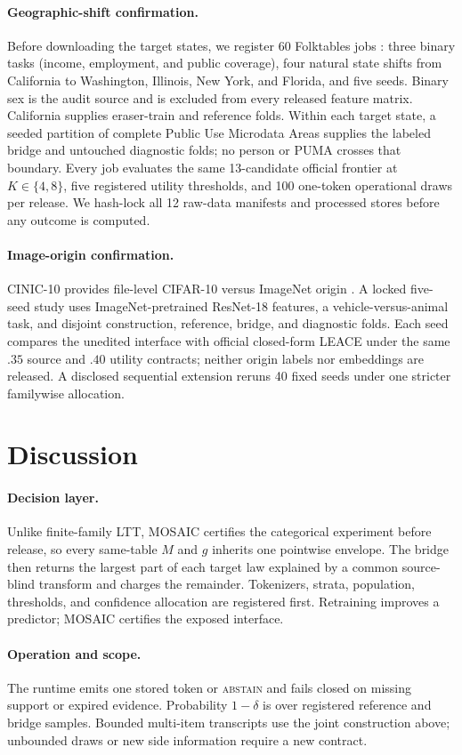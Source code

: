 \paragraph{Geographic-shift confirmation.}
Before downloading the target states, we register 60 Folktables jobs
\citep{ding2021folktables}: three binary tasks (income, employment, and public
coverage), four natural state shifts from California to Washington, Illinois,
New York, and Florida, and five seeds. Binary sex is the audit source and is
excluded from every released feature matrix. California supplies eraser-train
and reference folds. Within each target state, a seeded partition of complete
Public Use Microdata Areas supplies the labeled bridge and untouched diagnostic
folds; no person or PUMA crosses that boundary. Every job evaluates the same
13-candidate official frontier at $K\in\{4,8\}$, five registered utility
thresholds, and 100 one-token operational draws per release. We hash-lock all
12 raw-data manifests and processed stores before any outcome is computed.

\paragraph{Image-origin confirmation.}
CINIC-10 provides file-level CIFAR-10 versus ImageNet origin
\citep{darlow2018cinic}. A locked five-seed study uses ImageNet-pretrained
ResNet-18 features, a vehicle-versus-animal task, and disjoint construction,
reference, bridge, and diagnostic folds. Each seed compares the unedited
interface with official closed-form LEACE under the same $.35$ source and
$.40$ utility contracts; neither origin labels nor embeddings are released. A
disclosed sequential extension reruns 40 fixed seeds under one stricter
familywise allocation.





\section{Discussion}

\paragraph{Decision layer.}
Unlike finite-family LTT, MOSAIC certifies the categorical experiment before
release, so every same-table $M$ and $g$ inherits one pointwise envelope. The
bridge then returns the largest part of each target law explained by a common
source-blind transform and charges the remainder. Tokenizers, strata,
population, thresholds, and confidence allocation are registered first.
Retraining improves a predictor; MOSAIC certifies the exposed interface.

\paragraph{Operation and scope.}
The runtime emits one stored token or \textsc{abstain} and fails closed on
missing support or expired evidence. Probability $1-\delta$ is over registered
reference and bridge samples. Bounded multi-item transcripts use the joint
construction above; unbounded draws or new side information require a new
contract.
